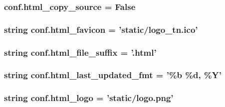 \subsubsection[{html\+\_\+copy\+\_\+source}]{\setlength{\rightskip}{0pt plus 5cm}conf.\+html\+\_\+copy\+\_\+source = {\bf False}}\label{namespaceconf_a771fe07e57b9dde77561c2dcb1f16204}
\hypertarget{namespaceconf_ac2a0566788a90720ba8d852f67eeda76}{}
\subsubsection[{html\+\_\+favicon}]{\setlength{\rightskip}{0pt plus 5cm}string conf.\+html\+\_\+favicon = 'static/logo\+\_\+tn.\+ico'}\label{namespaceconf_ac2a0566788a90720ba8d852f67eeda76}
\hypertarget{namespaceconf_a1baa1b929fcf352b86f395c155f18fe9}{}
\subsubsection[{html\+\_\+file\+\_\+suffix}]{\setlength{\rightskip}{0pt plus 5cm}string conf.\+html\+\_\+file\+\_\+suffix = '.html'}\label{namespaceconf_a1baa1b929fcf352b86f395c155f18fe9}
\hypertarget{namespaceconf_a65371021a0b434251045fdb650f90b87}{}
\subsubsection[{html\+\_\+last\+\_\+updated\+\_\+fmt}]{\setlength{\rightskip}{0pt plus 5cm}string conf.\+html\+\_\+last\+\_\+updated\+\_\+fmt = '\%{\bf b} \%d, \%Y'}\label{namespaceconf_a65371021a0b434251045fdb650f90b87}
\hypertarget{namespaceconf_a5c9fb4f5f81fbe64d03716f0dd7ff3cb}{}
\subsubsection[{html\+\_\+logo}]{\setlength{\rightskip}{0pt plus 5cm}string conf.\+html\+\_\+logo = 'static/logo.\+png'}\label{namespaceconf_a5c9fb4f5f81fbe64d03716f0dd7ff3cb}
\hypertarget{namespaceconf_ad2add41c6043d1066cc180e8d57cc4da}{}
